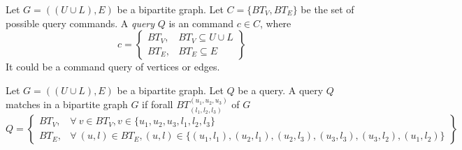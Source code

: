 \begin{definition}[Query]
Let $G=((U\cup L),E)$ be a bipartite graph. 
Let $C=\{BT_V, BT_E\}$ be the set of possible query commands.
A \textit{query} $Q$ is an command $c \in C$, where 
\[
c = \left\{\begin{array}{lr}
BT_V, & BT_V \subseteq U\cup L\\
BT_E, & BT_E \subseteq E
\end{array}\right\} 
\]
It could be a command query of vertices or edges.
\end{definition}

\begin{definition}\label{def:query:match}
Let $G=((U\cup L),E)$ be a bipartite graph.
Let $Q$ be a query.
A query $Q$ matches in a bipartite graph $G$ if forall $BT_{(l_1,l_2,l_3)}^{(u_1,u_2,u_3)}$ of $G$
\[
Q = \left\{\begin{array}{lr}
BT_V, & \forall\ v \in BT_V, v \in \{u_1,u_2,u_3,l_1,l_2,l_3\}\\
BT_E, & \forall\ (u,l) \in BT_E, (u,l) \in \{(u_1, l_1), (u_2,l_1), (u_2, l_3), (u_3,l_3), (u_3, l_2), (u_1,l_2)\} 
\end{array}\right\} 
\]
\end{definition}


